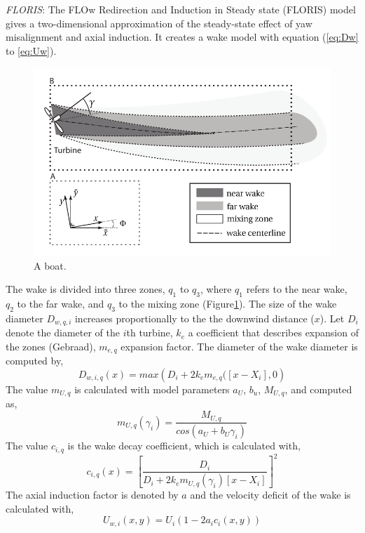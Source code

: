 \documentclass[twoside,twocolumn]{article}
\begin{document}
	\textit{FLORIS}: The FLOw Redirection and Induction in Steady state (FLORIS) model gives a two-dimensional approximation of the steady-state effect of yaw misalignment and axial induction. It creates a wake model with equation (\ref{eq:Dw} to \ref{eq:Uw}). 
\begin{figure}
\label{fig:wake}
  \includegraphics[width=\linewidth]{WakeFLORIS.png}
  \caption{A boat.}
\end{figure}
The wake is divided into three zones, $q_1$ to $q_3$, where $q_1$ refers to the near wake, $q_2$ to the far wake, and $q_3$ to the mixing zone (Figure\ref{fig:wake}).
The size of the wake diameter $D_{w,q,i}$ increases proportionally to the the downwind distance ($x$). Let $D_i$ denote the diameter of the $i$th turbine, $k_e$ a coefficient that describes expansion of the zones (Gebraad), $m_{e,q}$ expansion factor. The diameter of the wake diameter is computed by,
\begin{equation}
\label{eq:Dw}
D_{w,i,q}(x) = max\left( {D_i + 2k_em_{e,q}([x - X_i],0} \right)
\end{equation}
The value $m_{U,q}$ is calculated with model parameters $a_U$, $b_u$, $M_{U,q}$, and computed as,
\begin{equation}
\label{eq:mU}
m_{U,q}(\gamma_i) =  \frac{M_{U,q}}{cos(a_U+b_U\gamma_i)}
\end{equation}
The value $c_{i,q}$ is the wake decay coefficient, which is calculated with,
\begin{equation}
\label{eq:c}
c_{i,q}(x) = \left[ \frac{D_i}{D_i + 2k_em_{U,q}(\gamma_i)[x - X_i]} \right]^2
\end{equation}
The axial induction factor is denoted by $a$ and the velocity deficit of the wake is calculated with,
\begin{equation}
\label{eq:Uw}
U_{w,i}(x,y) = U_i\left( {1-2a_ic_i(x,y)} \right)
\end{equation}
\end{document}
